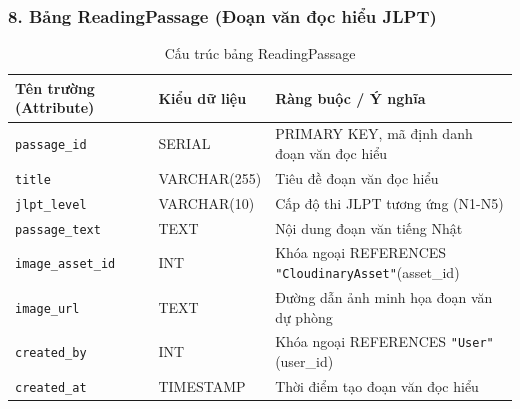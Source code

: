 \documentclass[../DoAn.tex]{subfiles}
\begin{document}
\subsubsection*{8. Bảng ReadingPassage (Đoạn văn đọc hiểu JLPT)}
\begin{table}[H]
\centering
\footnotesize
\renewcommand{\arraystretch}{1.2}
\begin{tabular}{|p{4.2cm}|p{3.2cm}|p{7.1cm}|}
\hline
\textbf{Tên trường (Attribute)} & \textbf{Kiểu dữ liệu} & \textbf{Ràng buộc / Ý nghĩa} \\
\hline
\texttt{passage\_id} & SERIAL & PRIMARY KEY, mã định danh đoạn văn đọc hiểu \\
\hline
\texttt{title} & VARCHAR(255) & Tiêu đề đoạn văn đọc hiểu \\
\hline
\texttt{jlpt\_level} & VARCHAR(10) & Cấp độ thi JLPT tương ứng (N1-N5) \\
\hline
\texttt{passage\_text} & TEXT & Nội dung đoạn văn tiếng Nhật \\
\hline
\texttt{image\_asset\_id} & INT & Khóa ngoại REFERENCES \texttt{"CloudinaryAsset"}(asset\_id) \\
\hline
\texttt{image\_url} & TEXT & Đường dẫn ảnh minh họa đoạn văn dự phòng \\
\hline
\texttt{created\_by} & INT & Khóa ngoại REFERENCES \texttt{"User"}(user\_id) \\
\hline
\texttt{created\_at} & TIMESTAMP & Thời điểm tạo đoạn văn đọc hiểu \\
\hline
\end{tabular}
\caption{Cấu trúc bảng ReadingPassage}
\label{tab:schema_readingpassage}
\end{table}
\end{document}
